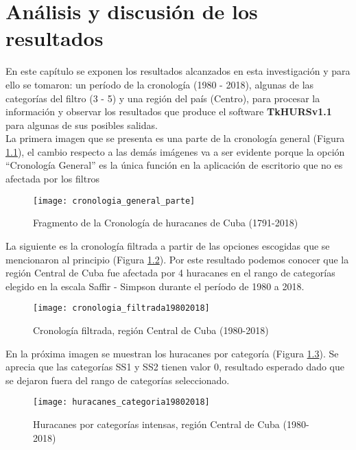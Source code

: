 \chapter{Análisis y discusión de los resultados}
En este capítulo se exponen los resultados alcanzados en esta investigación y para ello se tomaron: un período de la cronología (1980 - 2018), algunas de las categorías del filtro (3 - 5) y una región del país (Centro), para procesar la información y observar los resultados que produce el software \textbf{TkHURSv1.1} para algunas de sus posibles salidas.\\

La primera imagen que se presenta es una parte de la cronología general (Figura \ref{fig:cronologia_general_parte}), el cambio respecto a las demás imágenes va a ser evidente porque la opción ``Cronología General'' es la única función en la aplicación de escritorio que no es afectada por los filtros

\begin{figure}[H]
\centering
\texttt{[image: cronologia\_general\_parte]}
\caption{Fragmento de la Cronología de huracanes de Cuba (1791-2018)}
\label{fig:cronologia_general_parte}
\end{figure}

\pagebreak

La siguiente es la cronología filtrada a partir de las opciones escogidas que se mencionaron al principio (Figura \ref{fig:cronologia_filtrada19802018}). Por este resultado podemos conocer que la región Central de Cuba fue afectada por 4 huracanes en el rango de categorías elegido en la escala Saffir - Simpson durante el período de 1980 a 2018.


\begin{figure}[H]
\centering
\texttt{[image: cronologia\_filtrada19802018]}
\caption{Cronología filtrada, región Central de Cuba (1980-2018)}
\label{fig:cronologia_filtrada19802018}
\end{figure}

En la próxima imagen se muestran los huracanes por categoría (Figura \ref{fig:huracanes_categoria19802018}). Se aprecia que las categorías SS1 y SS2 tienen valor 0, resultado esperado dado que se dejaron fuera del rango de categorías seleccionado. 

\begin{figure}[H]
\centering
\texttt{[image: huracanes\_categoria19802018]}
\caption{Huracanes por categorías intensas, región Central de Cuba (1980-2018)}
\label{fig:huracanes_categoria19802018}
\end{figure}

